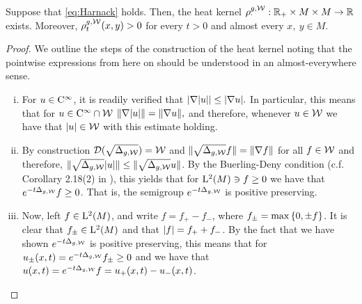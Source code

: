 \documentclass[a4paper, 12pt]{amsart}
\begin{document}
\begin{prop}
\label{prop:MainRed}
Suppose that \eqref{eq:Harnack} holds. Then, the heat
kernel $\rho^{g,\mathcal{W}}_{\cdotp}: \mathbb{R}_{+} \times M \times M \to \mathbb{R}$
exists. Moreover, $\rho^{g,\mathcal{W}}_t(x,y) > 0$ for
every $t > 0$ and almost every $x,\ y \in M$. 
\end{prop} 
\begin{proof}
We outline the steps of the construction of the heat kernel
noting that the pointwise expressions from here on should be
understood in an almost-everywhere sense.
\begin{enumerate}[(i)]
\item For $u \in {\rm C}^{\infty}_{\rm {}}$, it is readily verified that 
	$| \nabla |u|| \leq | \nabla u|.$
	In particular, this means that 
	for $u \in {\rm C}^{\infty}_{\rm {}} \cap \mathcal{W}$
	$\| \nabla |u| \| = \| \nabla u \|,$
	and therefore, whenever $u \in \mathcal{W}$
	we have that $|u| \in \mathcal{W}$ 
	with this estimate holding.

\item 	By construction ${\mathcal{D}}(\sqrt{\Delta_{g, \mathcal{W}}}) = \mathcal{W}$
	and $\| \sqrt{\Delta_{g,\mathcal{W}}} f \| = \| \nabla f \|$
	for all $f \in \mathcal{W}$ and therefore, 
	$\| \sqrt{\Delta_{g, \mathcal{W}}} |u| \| 
		\leq \| \sqrt{\Delta_{g, \mathcal{W}}} u \|$. 
	By the Buerling-Deny condition (c.f.  Corollary 2.18(2) in  \cite{El-Maati}), 
	this yields that for ${\rm L}^{2}_{\rm {}}(M) \ni f \geq 0$
	we have that  $e^{-t \Delta_{g,\mathcal{W}}} f \geq 0$. That is, the semigroup 
	$e^{-t \Delta_{g,\mathcal{W}}}$ is positive preserving.  

\item Now, left $f \in {\rm L}^{2}_{\rm {}}(M)$, and write
	$f = f_+ - f_-$, where $f_{\pm} = \max\left\{0,\pm f\right\}$.
	It is clear that $f_{\pm} \in {\rm L}^{2}_{\rm {}}(M)$
	and that $|f| = f_+ + f_-$.
	By the fact that we have shown $e^{-t\Delta_{g,\mathcal{W}}}$ 
	is positive preserving, this means that
	for $u_{\pm} (x,t) = e^{-t\Delta_{g,\mathcal{W}}} f_{\pm} \geq 0$	
	and we have that $u(x,t) = e^{-t \Delta_{g,\mathcal{W}}} f = u_+(x,t) - u_-(x,t)$.


\end{enumerate}
\end{proof}
\end{document}
